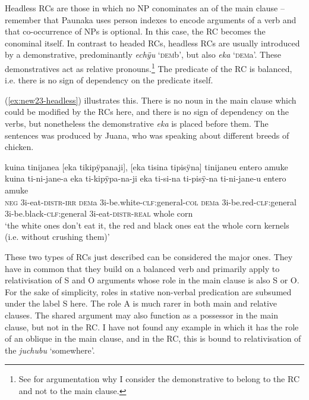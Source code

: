 Headless RCs are those in which no NP conominates an  of the main clause – remember that Paunaka uses person indexes to encode arguments of a verb and that co-occurrence of NPs is optional. In this case, the RC becomes the conominal itself. In contrast to headed RCs, headless RCs are usually introduced by a demonstrative, predominantly \textit{echÿu} ‘\textsc{dem}b’, but also \textit{eka} ‘\textsc{dem}a’. These demonstratives act as relative pronouns.\footnote{See  for argumentation why I consider the demonstrative to belong to the RC and not to the main clause.} The predicate of the RC is balanced, i.e. there is no sign of dependency on the predicate itself.

(\ref{ex:new23-headless}) illustrates this. There is no noun in the main clause which could be modified by the RCs here, and there is no sign of dependency on the verbs, but nonetheless the demonstrative \textit{eka} is placed before them. The sentences was produced by Juana, who was speaking about different breeds of chicken.

\ea\label{ex:new23-headless}
\begingl
\glpreamble kuina tinijanea \textup{[}eka tikipÿpanaji\textup{]}, \textup{[}eka tisina tipisÿna\textup{]} tinijaneu entero amuke\\
\gla kuina ti-ni-jane-a eka ti-kipÿpa-na-ji eka ti-si-na ti-pisÿ-na ti-ni-jane-u entero amuke\\
\glb \textsc{neg} 3i-eat-\textsc{distr}-\textsc{irr} \textsc{dem}a 3i-be.white-\textsc{clf:}general-\textsc{col} \textsc{dem}a 3i-be.red-\textsc{clf:}general 3i-be.black-\textsc{clf:}general 3i-eat-\textsc{distr}-\textsc{real} whole corn\\
\glft ‘the white ones don’t eat it, the red and black ones eat the whole corn kernels (i.e. without crushing them)’
\endgl
\trailingcitation{[jxx-e150925l-1.143-144]}
\xe{}

These two types of RCs just described can be considered the major ones. They have in common that they build on a balanced verb and primarily apply to relativisation of S and O arguments whose role in the main clause is also S or O. For the sake of simplicity, roles in stative non-verbal predication are subsumed under the label S here. The role A is much rarer in both main and relative clauses. The shared argument may also function as a possessor in the main clause, but not in the RC. I have not found any example in which it has the role of an oblique in the main clause, and in the RC, this is bound to relativisation of the  \textit{juchubu} ‘somewhere’. 

